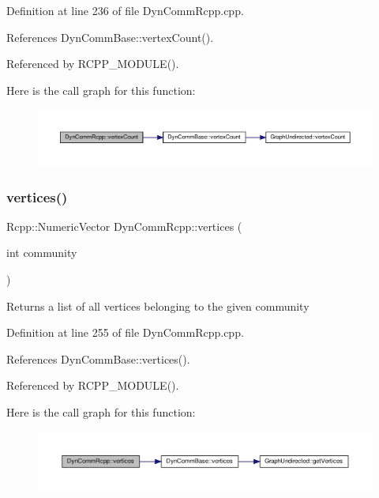Definition at line 236 of file Dyn\+Comm\+Rcpp.\+cpp.



References Dyn\+Comm\+Base\+::vertex\+Count().



Referenced by R\+C\+P\+P\+\_\+\+M\+O\+D\+U\+L\+E().

Here is the call graph for this function\+:
\nopagebreak
\begin{figure}[H]
\begin{center}
\leavevmode
\includegraphics[width=350pt]{classDynCommRcpp_af7bc0e9dc9a2c1e232b3e28b63388629_cgraph}
\end{center}
\end{figure}
\mbox{\label{classDynCommRcpp_ad849d8e27c9f8aec2f6cdf89b06b9be4}} 
\subsubsection{\texorpdfstring{vertices()}{vertices()}}
{\footnotesize\ttfamily Rcpp\+::\+Numeric\+Vector Dyn\+Comm\+Rcpp\+::vertices (\begin{DoxyParamCaption}\item[{int}]{community }\end{DoxyParamCaption})\hspace{0.3cm}{\ttfamily [inline]}}

\begin{DoxyReturn}{Returns}
a list of all vertices belonging to the given community 
\end{DoxyReturn}


Definition at line 255 of file Dyn\+Comm\+Rcpp.\+cpp.



References Dyn\+Comm\+Base\+::vertices().



Referenced by R\+C\+P\+P\+\_\+\+M\+O\+D\+U\+L\+E().

Here is the call graph for this function\+:
\nopagebreak
\begin{figure}[H]
\begin{center}
\leavevmode
\includegraphics[width=350pt]{classDynCommRcpp_ad849d8e27c9f8aec2f6cdf89b06b9be4_cgraph}
\end{center}
\end{figure}
\mbox{\label{classDynCommRcpp_aa2aa3fe8c7af4239bd9b3c6a669329ec}} 
